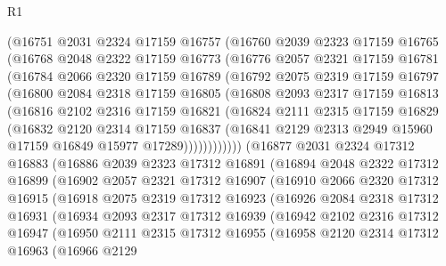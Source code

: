\begin{lexlean}{R1}
\begin{coremodule}
    (@16751
      @2031
      @2324
      @17159
      @16757
      (@16760
        @2039
        @2323
        @17159
        @16765
        (@16768
          @2048
          @2322
          @17159
          @16773
          (@16776
            @2057
            @2321
            @17159
            @16781
            (@16784
              @2066
              @2320
              @17159
              @16789
              (@16792
                @2075
                @2319
                @17159
                @16797
                (@16800
                  @2084
                  @2318
                  @17159
                  @16805
                  (@16808
                    @2093
                    @2317
                    @17159
                    @16813
                    (@16816
                      @2102
                      @2316
                      @17159
                      @16821
                      (@16824
                        @2111
                        @2315
                        @17159
                        @16829
                        (@16832
                          @2120
                          @2314
                          @17159
                          @16837
                          (@16841 @2129 @2313 @2949 @15960 @17159 @16849 @15977 @17289))))))))))))
    (@16877
      @2031
      @2324
      @17312
      @16883
      (@16886
        @2039
        @2323
        @17312
        @16891
        (@16894
          @2048
          @2322
          @17312
          @16899
          (@16902
            @2057
            @2321
            @17312
            @16907
            (@16910
              @2066
              @2320
              @17312
              @16915
              (@16918
                @2075
                @2319
                @17312
                @16923
                (@16926
                  @2084
                  @2318
                  @17312
                  @16931
                  (@16934
                    @2093
                    @2317
                    @17312
                    @16939
                    (@16942
                      @2102
                      @2316
                      @17312
                      @16947
                      (@16950
                        @2111
                        @2315
                        @17312
                        @16955
                        (@16958
                          @2120
                          @2314
                          @17312
                          @16963
                          (@16966
                            @2129

\end{coremodule}
\end{lexlean}
